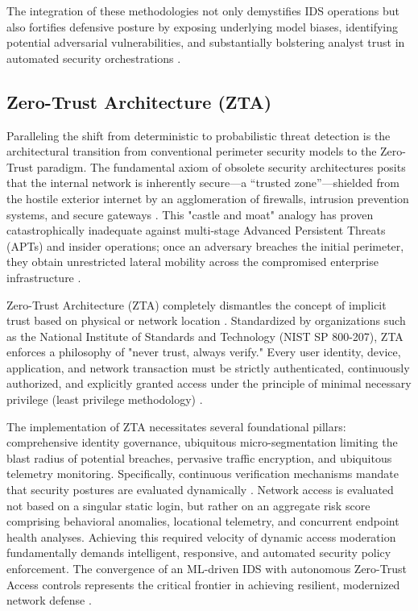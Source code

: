 \documentclass[conference]{IEEEtran}
\begin{document}
The integration of these methodologies not only demystifies IDS operations but also fortifies defensive posture by exposing underlying model biases, identifying potential adversarial vulnerabilities, and substantially bolstering analyst trust in automated security orchestrations \cite{chen2016xgboost}.

\subsection{Zero-Trust Architecture (ZTA)}
Paralleling the shift from deterministic to probabilistic threat detection is the architectural transition from conventional perimeter security models to the Zero-Trust paradigm. The fundamental axiom of obsolete security architectures posits that the internal network is inherently secure—a “trusted zone”—shielded from the hostile exterior internet by an agglomeration of firewalls, intrusion prevention systems, and secure gateways \cite{ke2017lightgbm}. This "castle and moat" analogy has proven catastrophically inadequate against multi-stage Advanced Persistent Threats (APTs) and insider operations; once an adversary breaches the initial perimeter, they obtain unrestricted lateral mobility across the compromised enterprise infrastructure \cite{ahmad2020network}.

Zero-Trust Architecture (ZTA) completely dismantles the concept of implicit trust based on physical or network location \cite{wang2021explainable}. Standardized by organizations such as the National Institute of Standards and Technology (NIST SP 800-207), ZTA enforces a philosophy of "never trust, always verify." Every user identity, device, application, and network transaction must be strictly authenticated, continuously authorized, and explicitly granted access under the principle of minimal necessary privilege (least privilege methodology) \cite{lundberg2017unified, ribeiro2016should}.

The implementation of ZTA necessitates several foundational pillars: comprehensive identity governance, ubiquitous micro-segmentation limiting the blast radius of potential breaches, pervasive traffic encryption, and ubiquitous telemetry monitoring. Specifically, continuous verification mechanisms mandate that security postures are evaluated dynamically \cite{stafford2020zero}. Network access is evaluated not based on a singular static login, but rather on an aggregate risk score comprising behavioral anomalies, locational telemetry, and concurrent endpoint health analyses. Achieving this required velocity of dynamic access moderation fundamentally demands intelligent, responsive, and automated security policy enforcement. The convergence of an ML-driven IDS with autonomous Zero-Trust Access controls represents the critical frontier in achieving resilient, modernized network defense \cite{sharafaldin2018toward}.
\end{document}
